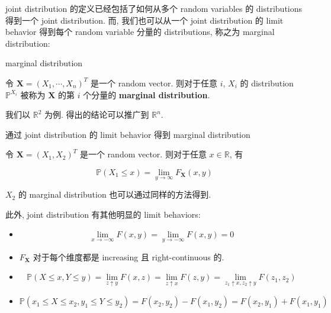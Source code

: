 \documentclass{qlnotes-export}
\begin{document}
joint distribution 的定义已经包括了如何从多个 random variables 的 distributions 得到一个 joint distribution. 而, 我们也可以从一个 joint distribution 的 limit behavior 得到每个 random variable 分量的 distributions, 称之为 marginal distribution:

\begin{definition}{marginal distribution}\label{def-03-joint-conditional-distribution-marginal-distribution}

令 \(\mathbf{X} = (X_{1},\cdots,X_{n})^{T}\) 是一个 random vector. 则对于任意 \(i\), \(X_{i}\) 的 distribution \({\mathbb{P}}^{X_{i}}\) 被称为 \(\mathbf{X}\) 的第 \(i\) 个分量的 \textbf{marginal distribution}.

\end{definition}

我们以 \({\mathbb{R}}^{2}\) 为例. 得出的结论可以推广到 \({\mathbb{R}}^{n}\).

\begin{proposition}{通过 joint distribution 的 limit behavior 得到 marginal distribution}\label{prop-03-joint-conditional-distribution-joint-distribution-limit-behavior-marginal-distributio}

令 \(\mathbf{X} = (X_{1},X_{2})^{T}\) 是一个 random vector. 则对于任意 \(x \in {\mathbb{R}}\), 有

\[{\mathbb{P}}(X_{1} \leq x) = \lim\limits_{y\rightarrow\infty}F_{\mathbf{X}}(x,y)\]

\(X_{2}\) 的 marginal distribution 也可以通过同样的方法得到.

此外, joint distribution 有其他明显的 limit behaviors:

\begin{itemize}
\item
  \[\lim\limits_{x\rightarrow - \infty}F(x,y) = \lim\limits_{y\rightarrow - \infty}F(x,y) = 0\]
\item
  \(F_{\mathbf{X}}\) 对于每个维度都是 increasing 且 right-continuous 的.
\item
  \[{\mathbb{P}}(X \leq x,Y \leq y) = \lim\limits_{z \uparrow y}F(x,z) = \lim\limits_{z \uparrow x}F(z,y) = \lim\limits_{z_{1} \uparrow x,z_{2} \uparrow y}F(z_{1},z_{2})\]
\item
  \[{\mathbb{P}}(x_{1} \leq X \leq x_{2},y_{1} \leq Y \leq y_{2}) = F(x_{2},y_{2}) - F(x_{1},y_{2}) = F(x_{2},y_{1}) + F(x_{1},y_{1})\]
\end{itemize}

\end{proposition}
\end{document}

